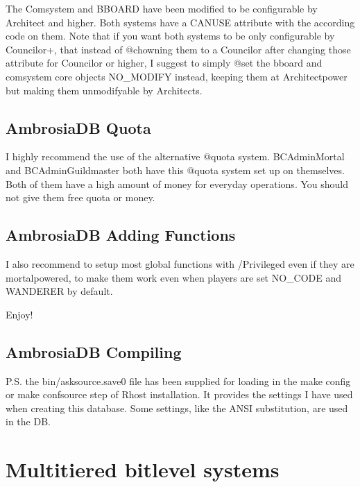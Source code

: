 \documentclass[letterpaper,10pt,english]{sphinxmanual}
\begin{document}
\sphinxAtStartPar
The Comsystem and BBOARD have been modified to be configurable by Architect and
higher. Both systems have a CANUSE attribute with the according code on them.
Note that if you want both systems to be only configurable by Councilor+, that
instead of @chowning them to a Councilor after changing those attribute for
Councilor or higher, I suggest to simply @set the bboard and comsystem core
objects NO\_MODIFY instead, keeping them at Architect\sphinxhyphen{}power but making them
unmodifyable by Architects.


\section{AmbrosiaDB Quota}
\label{\detokenize{ambrosiadb:ambrosiadb-quota}}
\sphinxAtStartPar
I highly recommend the use of the alternative @quota system. BC\sphinxhyphen{}Admin\sphinxhyphen{}Mortal
and BC\sphinxhyphen{}Admin\sphinxhyphen{}Guildmaster both have this @quota system set up on themselves. Both
of them have a high amount of money for everyday operations. You should not give
them free quota or money.


\section{AmbrosiaDB Adding Functions}
\label{\detokenize{ambrosiadb:ambrosiadb-adding-functions}}
\sphinxAtStartPar
I also recommend to setup most global functions with /Privileged even if they
are mortal\sphinxhyphen{}powered, to make them work even when players are set NO\_CODE and
WANDERER by default.

\sphinxAtStartPar
Enjoy!


\section{AmbrosiaDB Compiling}
\label{\detokenize{ambrosiadb:ambrosiadb-compiling}}
\sphinxAtStartPar
P.S. the \textquotesingle{}bin/asksource.save0\textquotesingle{} file has been supplied for loading in the
\textquotesingle{}make config\textquotesingle{} or \textquotesingle{}make confsource\textquotesingle{} step of Rhost installation. It provides the
settings I have used when creating this database. Some settings, like the ANSI
substitution, are used in the DB.

\sphinxAtStartPar
{}


\chapter{Multi\sphinxhyphen{}tiered bitlevel systems}
\label{\detokenize{bitlevels:multi-tiered-bitlevel-systems}}\label{\detokenize{bitlevels::doc}}
\end{document}
